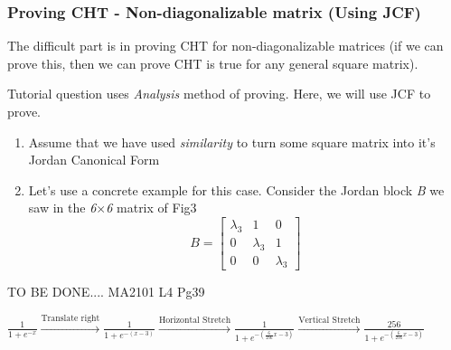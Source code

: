 \documentclass{article}
\begin{document}
\subsubsection{Proving CHT - Non-diagonalizable matrix (Using JCF)}
The difficult part is in proving CHT for non-diagonalizable matrices (if we can prove this, then we can prove CHT is true for any general square matrix).

Tutorial question uses \textit{Analysis} method of proving. Here, we will use JCF to prove.

\vspace{0.5cm}
\begin{enumerate}[label*=\arabic*.]
    \item Assume that we have used \textit{similarity} to turn some square matrix into it's Jordan Canonical Form
    \item Let's use a concrete example for this case. Consider the Jordan block \textit{B} we saw in the \textit{6}$\times$\textit{6} matrix of Fig3
            \[
                B=
                \begin{bmatrix}
                    \lambda_{3} & 1 & 0 \\
                    0 & \lambda_{3} & 1 \\
                    0 & 0 & \lambda_{3}
                \end{bmatrix}
            \] 
\end{enumerate}


TO BE DONE.... MA2101 L4 Pg39

$\frac{1}{1+e^{-x}} \xrightarrow{\text{Translate right}} \frac{1}{1+e^{-(x-3)}} \xrightarrow{\text{Horizontal Stretch}} \frac{1}{1+e^{-(\frac{6}{256}x-3)}} \xrightarrow{\text{Vertical Stretch}} \frac{256}{1+e^{-(\frac{6}{256}x-3)}}$
\end{document}
